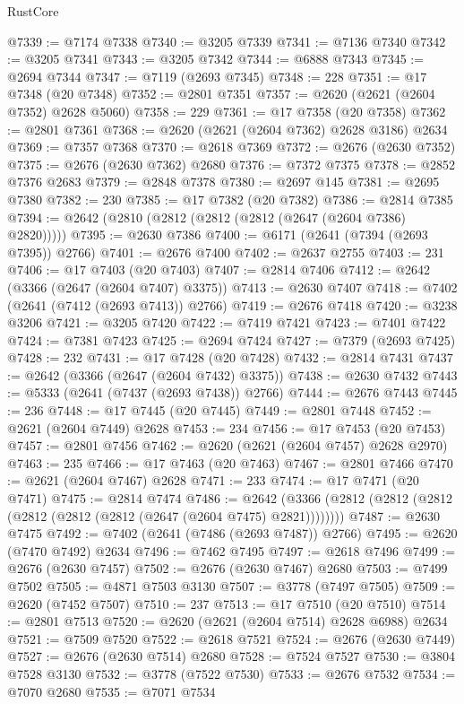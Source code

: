 \begin{lexlean}{RustCore}
\begin{coremodule}
@7339 := @7174 @7338
@7340 := @3205 @7339
@7341 := @7136 @7340
@7342 := @3205 @7341
@7343 := @3205 @7342
@7344 := @6888 @7343
@7345 := @2694 @7344
@7347 := @7119 (@2693 @7345)
@7348 := 228
@7351 := @17 @7348 (@20 @7348)
@7352 := @2801 @7351
@7357 := @2620 (@2621 (@2604 @7352) @2628 @5060)
@7358 := 229
@7361 := @17 @7358 (@20 @7358)
@7362 := @2801 @7361
@7368 := @2620 (@2621 (@2604 @7362) @2628 @3186) @2634
@7369 := @7357 @7368
@7370 := @2618 @7369
@7372 := @2676 (@2630 @7352)
@7375 := @2676 (@2630 @7362) @2680
@7376 := @7372 @7375
@7378 := @2852 @7376 @2683
@7379 := @2848 @7378
@7380 := @2697 @145
@7381 := @2695 @7380
@7382 := 230
@7385 := @17 @7382 (@20 @7382)
@7386 := @2814 @7385
@7394 := @2642 (@2810 (@2812 (@2812 (@2812 (@2647 (@2604 @7386) @2820)))))
@7395 := @2630 @7386
@7400 := @6171 (@2641 (@7394 (@2693 @7395)) @2766)
@7401 := @2676 @7400
@7402 := @2637 @2755
@7403 := 231
@7406 := @17 @7403 (@20 @7403)
@7407 := @2814 @7406
@7412 := @2642 (@3366 (@2647 (@2604 @7407) @3375))
@7413 := @2630 @7407
@7418 := @7402 (@2641 (@7412 (@2693 @7413)) @2766)
@7419 := @2676 @7418
@7420 := @3238 @3206
@7421 := @3205 @7420
@7422 := @7419 @7421
@7423 := @7401 @7422
@7424 := @7381 @7423
@7425 := @2694 @7424
@7427 := @7379 (@2693 @7425)
@7428 := 232
@7431 := @17 @7428 (@20 @7428)
@7432 := @2814 @7431
@7437 := @2642 (@3366 (@2647 (@2604 @7432) @3375))
@7438 := @2630 @7432
@7443 := @5333 (@2641 (@7437 (@2693 @7438)) @2766)
@7444 := @2676 @7443
@7445 := 236
@7448 := @17 @7445 (@20 @7445)
@7449 := @2801 @7448
@7452 := @2621 (@2604 @7449) @2628
@7453 := 234
@7456 := @17 @7453 (@20 @7453)
@7457 := @2801 @7456
@7462 := @2620 (@2621 (@2604 @7457) @2628 @2970)
@7463 := 235
@7466 := @17 @7463 (@20 @7463)
@7467 := @2801 @7466
@7470 := @2621 (@2604 @7467) @2628
@7471 := 233
@7474 := @17 @7471 (@20 @7471)
@7475 := @2814 @7474
@7486 := @2642 (@3366 (@2812 (@2812 (@2812 (@2812 (@2812 (@2812 (@2647 (@2604 @7475) @2821))))))))
@7487 := @2630 @7475
@7492 := @7402 (@2641 (@7486 (@2693 @7487)) @2766)
@7495 := @2620 (@7470 @7492) @2634
@7496 := @7462 @7495
@7497 := @2618 @7496
@7499 := @2676 (@2630 @7457)
@7502 := @2676 (@2630 @7467) @2680
@7503 := @7499 @7502
@7505 := @4871 @7503 @3130
@7507 := @3778 (@7497 @7505)
@7509 := @2620 (@7452 @7507)
@7510 := 237
@7513 := @17 @7510 (@20 @7510)
@7514 := @2801 @7513
@7520 := @2620 (@2621 (@2604 @7514) @2628 @6988) @2634
@7521 := @7509 @7520
@7522 := @2618 @7521
@7524 := @2676 (@2630 @7449)
@7527 := @2676 (@2630 @7514) @2680
@7528 := @7524 @7527
@7530 := @3804 @7528 @3130
@7532 := @3778 (@7522 @7530)
@7533 := @2676 @7532
@7534 := @7070 @2680
@7535 := @7071 @7534

\end{coremodule}
\end{lexlean}
